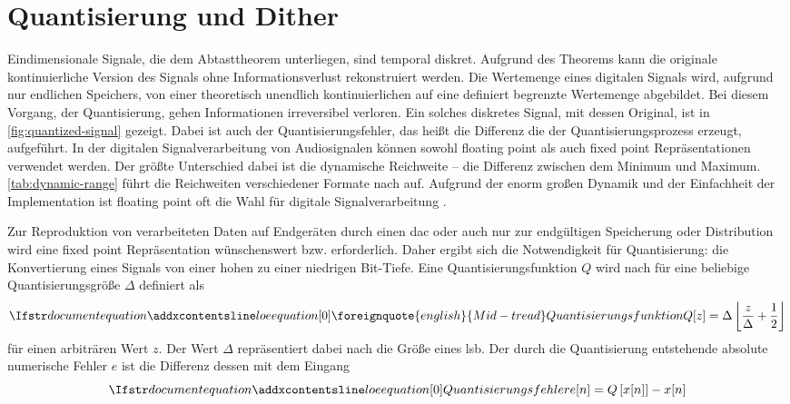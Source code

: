 
\cleartoleftpage

\thispagestyle{empty}
\vspace*{\fill}
\newpage

\onehalfspacing
{}
\setcounter{page}{1}
\pagestyle{scrheadings}
\mleftright

\section{Quantisierung und Dither}

Eindimensionale Signale, die dem \citeauthor{shannon} Abtasttheorem \autocite{shannon} unterliegen, sind temporal diskret.
Aufgrund des Theorems kann die originale kontinuierliche Version des Signals ohne Informationsverlust rekonstruiert werden.
Die Wertemenge eines digitalen Signals wird, aufgrund nur endlichen Speichers, von einer theoretisch unendlich kontinuierlichen auf eine definiert begrenzte Wertemenge abgebildet.
Bei diesem Vorgang, der Quantisierung, gehen Informationen irreversibel verloren.
Ein solches diskretes Signal, mit dessen Original, ist in \autoref{fig:quantized-signal} gezeigt.
Dabei ist auch der Quantisierungsfehler, das heißt die Differenz die der Quantisierungsprozess erzeugt, aufgeführt.
In der digitalen Signalverarbeitung von Audiosignalen können sowohl \gls{floating point} als auch \gls{fixed point} Repräsentationen verwendet werden.
Der größte Unterschied dabei ist die dynamische Reichweite -- die Differenz zwischen dem Minimum und Maximum.
\autoref{tab:dynamic-range} führt die Reichweiten verschiedener Formate nach \citeauthor{dsp-guide} auf.
Aufgrund der enorm großen Dynamik und der Einfachheit der Implementation ist \gls{floating point} oft die Wahl für digitale Signalverarbeitung \autocite[S. 68ff]{dsp-guide}.

Zur Reproduktion von verarbeiteten Daten auf Endgeräten durch einen \gls{dac} oder auch nur zur endgültigen Speicherung oder Distribution wird eine \gls{fixed point} Repräsentation wünschenswert bzw. erforderlich.
Daher ergibt sich die Notwendigkeit für Quantisierung: die Konvertierung eines Signals von einer hohen zu einer niedrigen Bit-Tiefe.
Eine Quantisierungsfunktion $Q$ wird nach \citeauthor{dither} für eine beliebige Quantisierungsgröße $\Delta$ definiert als
\begin{equation}
    \setequationentry{\foreignquote{english}{Mid-tread} Quantisierungsfunktion}
    Q[z] = \Delta \left\lfloor \frac{z}{\Delta} + \frac{1}{2} \right\rfloor
\end{equation}
für einen arbiträren Wert $z$.
Der Wert $\Delta$ repräsentiert dabei nach \citeauthor{dither} die Größe eines \gls{lsb}.
Der durch die Quantisierung entstehende absolute numerische Fehler $e$ ist die Differenz dessen mit dem Eingang
\begin{equation}
\setequationentry{Quantisierungsfehler}
e[n] = Q\left[x[n]\right] - x[n]
\end{equation}

